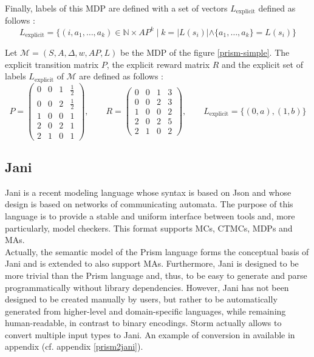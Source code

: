 Finally, labels of this MDP are defined with a set of vectors $L_\text{explicit}$ defined as follows : \[L_\text{explicit} = \{(i, a_1, \dots, a_k) \in \mathbb{N} \times AP^k \; | \; k = |L(s_i)| \wedge \{a_1, \dots, a_k\} = L(s_i)\}\]

\begin{example}
Let $\mathcal{M}=(S, A, \Delta, w, AP, L)$ be the MDP of the figure \ref{prism-simple}. The explicit transition matrix $P$, the explicit reward matrix $R$ and the explicit set of labels $L_\text{explicit}$ of $\mathcal{M}$ are defined as follows :
  \begin{equation*}
  P =
  	\begin{pmatrix}
  	0 & 0 & 1 & \frac{1}{2} \\[0.3em]
  	0 & 0 & 2 & \frac{1}{2} \\[0.3em]
  	1 & 0 & 0 & 1 \\[0.3em]
    2 & 0 & 2 & 1 \\[0.3em]
    2 & 1 & 0 & 1
  	\end{pmatrix}, \quad \quad
  R =
    \begin{pmatrix}
  	0 & 0 & 1 & 3 \\[0.3em]
  	0 & 0 & 2 & 3 \\[0.3em]
  	1 & 0 & 0 & 2 \\[0.3em]
    2 & 0 & 2 & 5 \\[0.3em]
    2 & 1 & 0 & 2
    \end{pmatrix}, \quad \quad
  L_\text{explicit} = \{ (0, a), (1, b) \}
  \end{equation*}
\end{example}

\subsection{Jani}
Jani \cite{JQM} is a recent modeling language whose syntax is based on Json and whose design is based on networks of communicating automata.
The purpose of this language is to provide a stable and uniform interface
between tools and, more particularly, model checkers.
This format supports MCs, CTMCs, MDPs and MAs. \\

Actually, the semantic model of the Prism language forms the conceptual basis of
Jani and is extended to also support MAs.
Furthermore, Jani is designed to be more trivial than the Prism language and, thus,
to be easy to generate and parse programmatically without library dependencies.
However, Jani has not been designed to be created manually by users, but rather
to be automatically generated from higher-level and domain-specific languages, while remaining human-readable, in contrast to binary encodings. Storm actually allows to
convert multiple input types to Jani. An example of conversion in available in appendix (cf. appendix \ref{prism2jani}).


